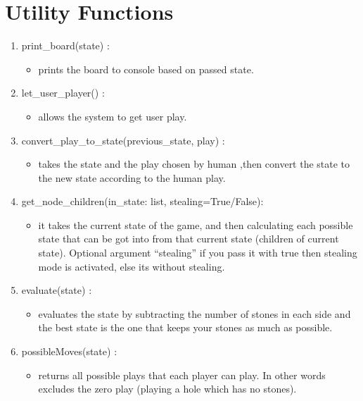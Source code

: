 \section{Utility Functions}
\begin{enumerate}
    \item print\_board(state) :
    \begin{itemize}
        \item prints the board to console based on passed state.
    \end{itemize}
    \item let\_user\_player() :
    \begin{itemize}
        \item allows the system to get user play.
    \end{itemize}
    \item convert\_play\_to\_state(previous\_state, play) : 
    \begin{itemize}
        \item takes the state and the play chosen by human ,then convert the state to the new state according to the human play.  
    \end{itemize}
    \vskip 0.5in
    \item get\_node\_children(in\_state: list, stealing=True/False):  
    \begin{itemize}
    \item it takes the current state of the game, and then calculating each possible state that can be
     got into from that current state (children of current state). Optional argument “stealing” if you 
     pass it with true then stealing mode is activated, else its without stealing.
    \end{itemize}
    \vskip 0.1in
    \item evaluate(state)  :
    \begin{itemize}
        \item evaluates the state by subtracting the number of stones in each side and the best state
         is the one that keeps your stones as much as possible.  
    \end{itemize}
    \item possibleMoves(state) :
    \begin{itemize}
        \item returns all possible plays that each player can play. In other words excludes
         the zero play (playing a hole which has no stones).
    \end{itemize}




\end{enumerate}
